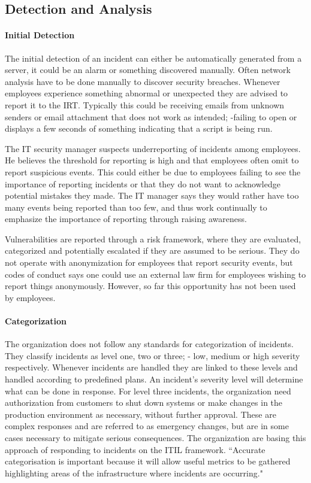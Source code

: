 \subsection{Detection and Analysis}
\paragraph{Initial Detection}
The initial detection of an incident can either be automatically generated from a server, it could be an alarm or something discovered manually. Often network analysis have to be done manually to discover security breaches. Whenever employees experience something abnormal or unexpected they are advised to report it to the \ac{IRT}. Typically this could be receiving emails from unknown senders or email attachment that does not work as intended; -failing to open or displays a few seconds of something indicating that a script is being run.

The IT security manager suspects underreporting of incidents among employees. He believes the threshold for reporting is high and that employees often omit to report suspicious events. This could either be due to employees failing to see the importance of reporting incidents or that they do not want to acknowledge potential mistakes they made. The IT manager says they would rather have too many events being reported than too few, and thus work continually to emphasize the importance of reporting through raising awareness.

Vulnerabilities are reported through a risk framework, where they are evaluated, categorized and potentially escalated if they are assumed to be serious. They do not operate with anonymization for employees that report security events, but codes of conduct says one could use an external law firm for employees wishing to report things anonymously. However, so far this opportunity has not been used by employees. 

\paragraph{Categorization}
The organization does not follow any standards for categorization of incidents. They classify incidents as level one, two or three; - low, medium or high severity respectively. Whenever incidents are handled they are linked to these levels and handled according to predefined plans. An incident's severity level will determine what can be done in response. For level three incidents, the organization need authorization from customers to shut down systems or make changes in the production environment as necessary, without further approval. These are complex responses and are referred to as emergency changes, but are in some cases necessary to mitigate serious consequences. The organization are basing this approach of responding to incidents on the ITIL framework. ``Accurate categorisation is important because it will allow useful metrics to be gathered highlighting areas of the infrastructure where incidents are occurring\cite{itilbok}."

